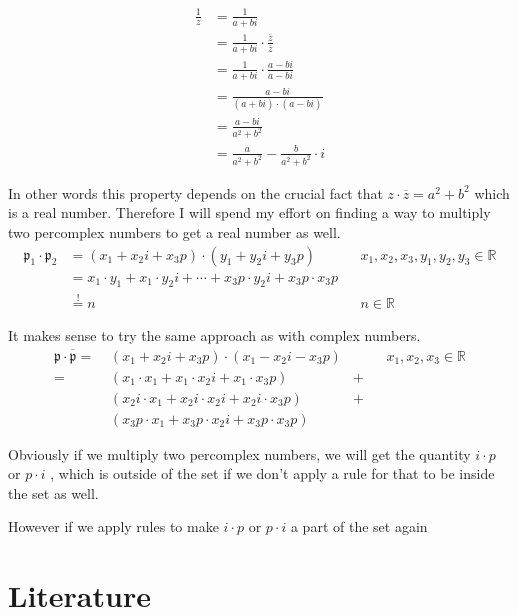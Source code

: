 \documentclass[a4paper,english,parskip]{scrartcl}
\begin{document}
\begin{align*}
\frac{1}{z} &= \frac{1}{a + bi} \\
&= \frac{1}{a + bi} \cdot \frac{\overline{z}}{\overline{z}} \\
&= \frac{1}{a + bi} \cdot \frac{a - bi}{a - bi} \\
&= \frac{a - bi}{(a + bi) \cdot (a - bi)} \\
&= \frac{a - bi}{a^2 + b^2} \\
&= \frac{a}{a^2 + b^2} - \frac{b}{a^2 + b^2} \cdot i
\end{align*}

In other words this property depends on the crucial fact that $z \cdot \overline{z} = a^2 + b^2$ which is a real number.
Therefore I will spend my effort on finding a way to multiply two percomplex numbers to get a real number as well. 
\begin{align*}
\mathfrak{p}_1 \cdot \mathfrak{p}_2 &= (x_1 + x_2i +x_3p) \cdot (y_1 + y_2i + y_3p) && x_1,x_2,x_3, y_1,y_2,y_3 \in \mathbb{R} \\
&= x_1 \cdot y_1 + x_1 \cdot y_2i + \cdots + x_3p \cdot y_2i + x_3p \cdot x_3p  \\
&\stackrel{!}{=} n &&  n \in \mathbb{R}
\end{align*}

It makes sense to try the same approach as with complex numbers.
\begin{align*}
\mathfrak{p} \cdot \overline{\mathfrak{p}} = \hspace{3pt}& (x_1 + x_2i +x_3p) \cdot (x_1 - x_2i - x_3p) &&& x_1,x_2,x_3 \in \mathbb{R} \\
= \hspace{3pt} & (x_1 \cdot x_1 + x_1 \cdot x_2i + x_1 \cdot x_3p)  &+ \\
& (x_2i \cdot x_1 + x_2i \cdot x_2i + x_2i \cdot x_3p) &+ \\
& (x_3p \cdot x_1 + x_3p \cdot x_2i + x_3p \cdot x_3p)
\end{align*}

Obviously if we multiply two percomplex numbers, we will get the quantity $i \cdot p$ or $p \cdot i$ , which is outside of the set if we don't apply a rule for that to be inside the set as well.

However if we apply rules to make $i \cdot p$ or $p \cdot i$ a part of the set again

	
	\newpage
	\section{Literature}
	
	
	\printbibliography[type=article, title={Articles}]
	\printbibliography[type=thesis, title={Papers}]
	\printbibliography[type=inbook, title={Book Excerpts}]
	\printbibliography[type=inproceedings, title={Inproceedings}]
	
\end{document}

